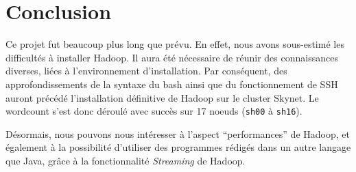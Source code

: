 \section{Conclusion}

\par Ce projet fut beaucoup plus long que prévu. En effet, nous avons sous-estimé les difficultés à installer Hadoop. Il aura été nécessaire de réunir des connaissances diverses, liées à l'environnement d'installation. Par conséquent, des approfondissements de la syntaxe du bash ainsi que du fonctionnement de SSH auront précédé l'installation définitive de Hadoop sur le cluster Skynet. Le wordcount s'est donc déroulé avec succès sur 17 noeuds (\texttt{sh00} à \texttt{sh16}).
\par Désormais, nous pouvons nous intéresser à l'aspect ``performances'' de Hadoop, et également à la possibilité d'utiliser des programmes rédigés dans un autre langage que Java, grâce à la fonctionnalité \emph{Streaming} de Hadoop.

